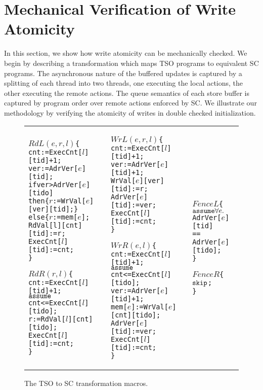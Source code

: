 \section{Mechanical Verification of Write Atomicity}
\label{sec:mechanical-verification}
In this section, we show how write atomicity can be mechanically checked.
We begin by describing a transformation which maps TSO programs to equivalent SC programs.
The asynchronous nature of the buffered updates is captured by a splitting of each thread into two threads, one executing the local actions, the other executing the remote actions.
The queue semantics of each store buffer is captured by program order over remote actions enforced by SC.
We illustrate our methodology by verifying the atomicity of writes in double checked initialization. 


\begin{figure*}
{\small
\begin{tabular}{p{}p{}p{}}
\begin{alltt}\(RdL(e,r,l)\) \{  
 cnt:=ExecCnt[\(l\)][tid]+1;
 ver:=AdrVer[\(e\)][tid];
 if ver>AdrVer[\(e\)][tido]
 then \{\(r\):=WrVal[\(e\)][ver][tid]; \}
 else \{\(r\):=mem[\(e\)];
 RdVal[l][cnt][tid]:=r;
 ExecCnt[\(l\)][tid]:=cnt;
\}

\(RdR(r,l)\) \{
 cnt:=ExecCnt[\(l\)][tid]+1;
 \(\aliassume\) cnt<=ExecCnt[\(l\)][tido];
 r := RdVal[\(l\)][cnt][tido];
 ExecCnt[\(l\)][tid]:=cnt;
\}
\end{alltt} &

\begin{alltt}\(WrL(e,r,l)\) \{
 cnt:=ExecCnt[\(l\)][tid]+1;
 ver:=AdrVer[\(e\)][tid]+1;
 WrVal[\(e\)][ver][tid]:=r;
 AdrVer[\(e\)][tid]:=ver;
 ExecCnt[\(l\)][tid]:=cnt;
\}

\(WrR(e,l)\) \{
 cnt:=ExecCnt[\(l\)][tid]+1;
 \(\aliassume\) cnt<=ExecCnt[\(l\)][tido];
 ver:=AdrVer[\(e\)][tid]+1;
 mem[\(e\)]:=WrVal[\(e\)][cnt][tido];
 AdrVer[\(e\)][tid]:=ver;
 ExecCnt[\(l\)][tid]:=cnt;
\}\end{alltt} & 

\begin{alltt}
\(FenceL\) \{
 \(\aliassume \forall e.\) 
   AdrVer[\(e\)][tid]
        ==
   AdrVer[\(e\)][tido];
\}

\(FenceR\) \{
 \(\aliskip\);
\}\end{alltt}
\end{tabular}
}
\caption{The TSO to SC transformation macros.}
\label{fig:transformation-macros}
\end{figure*}


